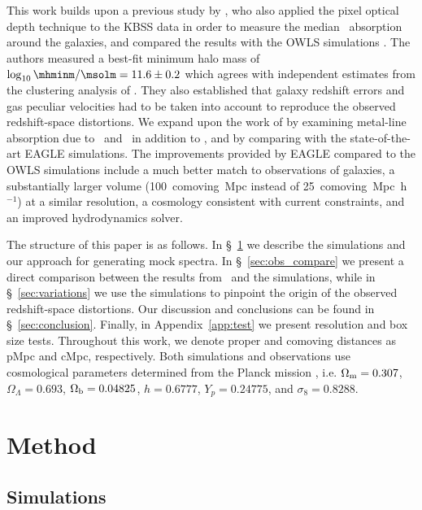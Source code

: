 \documentclass[useAMS,usenatbib,letterpaper]{mn2e}
\def\obspaper{\citetalias{turner14}}
\begin{document}
This work builds upon a previous study by \citet{rakic12, rakic13}, 
who also applied the pixel optical depth technique to 
the KBSS data in order to measure the median \hone\ absorption 
around the galaxies, and compared the results with the OWLS simulations
\citep{schaye10}. The authors measured a best-fit minimum halo mass of 
$\log_{10}\mhminm/\msolm = 11.6\pm0.2$
which agrees with independent estimates from the clustering analysis 
of \citet[$\log_{10}\mhminm/\msolm = 11.7$]{trainor12}. 
They also established that galaxy redshift errors and 
gas peculiar velocities had to be taken into account to reproduce 
the observed redshift-space distortions.
We expand upon the work of \citet{rakic13} by examining 
metal-line absorption due to \cfour\ and \sifour\ in addition to \hone,
and by comparing with the state-of-the-art EAGLE simulations. The improvements
provided by EAGLE compared to the OWLS simulations include
a much better match to observations of galaxies, 
a substantially larger volume (100~comoving~Mpc instead of 25~comoving~Mpc~h$^{-1}$) at a similar resolution,
a cosmology consistent with current constraints, and an improved hydrodynamics solver.

The structure of this paper is as follows. In \S~\ref{sec:method} we 
describe the simulations and our approach for generating mock spectra. 
In \S~\ref{sec:obs_compare} we present a direct comparison between the results
from \obspaper\ and the simulations, while in \S~\ref{sec:variations} we 
use the simulations to pinpoint the origin of the observed redshift-space distortions. 
Our discussion and conclusions can be found in \S~\ref{sec:conclusion}. Finally, in 
Appendix~\ref{app:test} we present resolution and box size tests.
Throughout this work, we denote proper and comoving distances as 
pMpc and cMpc, respectively. 
Both simulations and observations use cosmological parameters
determined from the Planck mission \citep{planck13}, i.e.
$\Omega_{\rm m} = 0.307$,  
$\Omega_{\Lambda} = 0.693$,
$\Omega_{\rm b} = 0.04825$,
$h = 0.6777$,
$Y_p = 0.24775$, and 
$\sigma_8=0.8288$. 





\section{Method}
\label{sec:method}


\subsection{Simulations}
\end{document}

